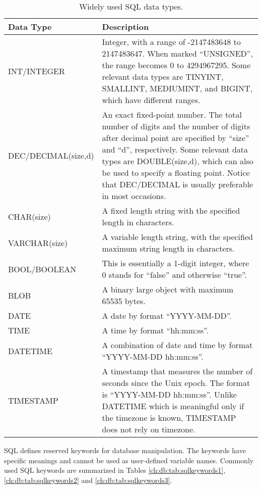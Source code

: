 \begin{table}
	\centering \caption{Widely used SQL data types.}\label{ch:db:tab:sqldatatypes}
	\begin{tabularx}{\textwidth}{lX}
		\hline
		Data Type & Description \\ \hline
		INT/INTEGER & Integer, with a range of -2147483648 to 2147483647. When marked ``UNSIGNED'', the range becomes 0 to 4294967295. Some relevant data types are TINYINT, SMALLINT, MEDIUMINT, and BIGINT, which have different ranges. \\ 
		DEC/DECIMAL(size,d) & An exact fixed-point number. The total number of digits and the number of digits after decimal point are specified by ``size'' and ``d'', respectively. Some relevant data types are DOUBLE(size,d), which can also be used to specify a floating point. Notice that DEC/DECIMAL is usually preferable in most occasions. \\ 
		CHAR(size) & A fixed length string with the specified length in characters. \\ 
		VARCHAR(size) & A variable length string, with the specified maximum string length in characters. \\ 
		BOOL/BOOLEAN & This is essentially a 1-digit integer, where 0 stands for ``false'' and otherwise ``true''. \\ 
		BLOB & A binary large object with maximum 65535 bytes. \\ 
		DATE & A date by format ``YYYY-MM-DD''. \\ 
		TIME & A time by format ``hh:mm:ss''. \\ 
		DATETIME & A combination of date and time by format ``YYYY-MM-DD hh:mm:ss''. \\ 
		TIMESTAMP & A timestamp that measures the number of seconds since the Unix epoch. The format is ``YYYY-MM-DD hh:mm:ss''. Unlike DATETIME which is meaningful only if the timezone is known, TIMESTAMP does not rely on timezone. \\ \hline
	\end{tabularx}
\end{table}

SQL defines reserved keywords for database manipulation. The keywords have specific meanings and cannot be used as user-defined variable names. Commonly used SQL keywords are summarized in Tables \ref{ch:db:tab:sqlkeywords1}, \ref{ch:db:tab:sqlkeywords2} and \ref{ch:db:tab:sqlkeywords3}.

